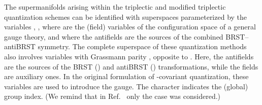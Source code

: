 \documentclass[a4paper,11pt]{article}
\begin{document}
The supermanifolds arising within the triplectic \cite{3pl} and modified
triplectic \cite{mod3pl} quantization schemes can be identified with
superspaces parameterized by the variables \coordHE{},
\coordHE{}, where \coordHE{} are the (field) variables of the
configuration space of a general gauge theory, and where the antifields \coordHE{} are the sources of the combined BRST--antiBRST symmetry. The
complete superspace of these quantization methods also involves variables \coordHE{} with Grassmann parity \coordHE{}, opposite to \coordHE{}. Here, the antifields \coordHE{} are the sources of the BRST (\coordHE{}) and antiBRST (\coordHE{})
transformations, while the fields \coordHE{} are auxiliary ones. In the
original formulation of \coordHE{}-covariant quantization, these variables are
used to introduce the gauge. The character \coordHE{} indicates the (global)
\coordHE{}
group index. (We remind that in Ref.~\cite{gln} only the case \coordHE{} was considered.)
\end{document}
